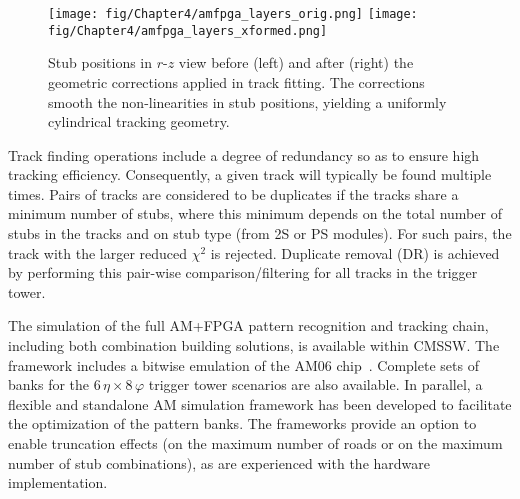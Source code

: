 \begin{figure}[t]
  \centering
\texttt{[image: fig/Chapter4/amfpga\_layers\_orig.png]}
\hfill
\texttt{[image: fig/Chapter4/amfpga\_layers\_xformed.png]}
  \caption{Stub positions in $r$-$z$ view before (left) and after (right) the geometric corrections applied in track fitting. The corrections smooth the non-linearities in stub positions, yielding a uniformly cylindrical tracking geometry.} 
  \label{fig:amfpga_layers}
\end{figure}

Track finding operations include a degree of redundancy so as to ensure high tracking efficiency. Consequently, a given track will typically be found multiple times. Pairs of tracks are considered to be duplicates if the tracks share a minimum number of stubs, where this minimum depends on the total number of stubs in the tracks and on stub type (from 2S or PS modules). For such pairs, the track with the larger reduced $\chi^{2}$ is rejected. Duplicate removal (DR) is achieved by performing this pair-wise comparison/filtering for all tracks in the trigger tower.

The simulation of the full AM+FPGA pattern recognition and tracking chain, including both combination building solutions, is available within CMSSW. The framework includes a bitwise emulation of the AM06 chip~\cite{1748-0221-12-04-C04013}. Complete sets of banks for the $6\,\eta\times 8\,\varphi$ trigger tower scenarios are also available. In parallel, a flexible and standalone AM simulation framework has been developed to facilitate the optimization of the pattern banks. The frameworks provide an option to enable truncation effects (\eg on the maximum number of roads or on the maximum number of stub combinations), as are experienced with the hardware implementation.


